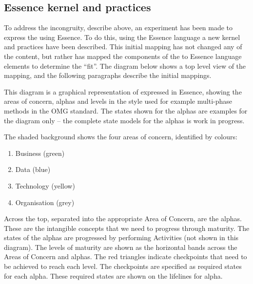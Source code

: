 \subsection{ Essence kernel and practices}\label{subsec:KG-MM-Essence-kernel-and-practices}
To address the incongruity, describe above, an experiment has been made to express the  using Essence. To do this, using the Essence language a new kernel and practices have been described.
This initial mapping has not changed any of the content, but rather has mapped the components of the  to Essence language elements to determine the “fit”.
The diagram below shows a top level view of the mapping, and the following paragraphs describe the initial mappings.


This diagram is a graphical representation of  expressed in Essence, showing the areas of concern, alphas and levels in the style used for example multi-phase methods in the OMG standard.
The states shown for the alphas are examples for the diagram only – the complete state models for the alphas is work in progress.

The shaded background shows the four areas of concern, identified by colours:
\begin{enumerate}
    \item Business (green)
    \item Data (blue)
    \item Technology (yellow)
    \item Organisation (grey)
\end{enumerate}

Across the top, separated into the appropriate Area of Concern, are the alphas.
These are the intangible concepts that we need to progress through maturity.
The states of the alphas are progressed by performing Activities (not shown in this diagram).
The levels of maturity are shown as the horizontal bands across the Areas of Concern and alphas.
The red triangles indicate checkpoints that need to be achieved to reach each level.
The checkpoints are specified as required states for each alpha.
These required states are shown on the lifelines for alpha.

